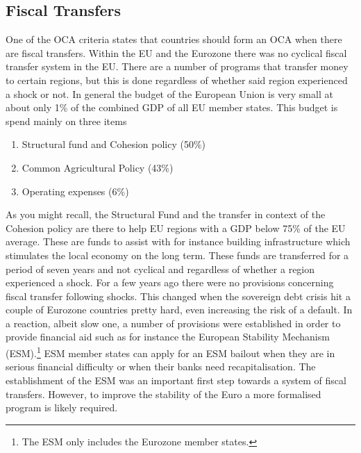\documentclass{tufte-handout}
\begin{document}
\subsection{Fiscal Transfers}
One of the OCA criteria states that countries should form an OCA when there are fiscal transfers. 
Within the EU and the Eurozone there was no cyclical fiscal transfer system in the EU.
There are a number of programs that transfer money to certain regions, but this is done regardless of whether said region experienced a shock or not. 
In general the budget of the European Union is very small at about only 1\% of the combined GDP of all EU member states. 
This budget is spend mainly on three items
\begin{enumerate}
  \item Structural fund and Cohesion policy (50\%)
  \item Common Agricultural Policy (43\%)
  \item Operating expenses (6\%)
\end{enumerate}
As you might recall, the Structural Fund and the transfer in context of the Cohesion policy are there to help EU regions with a GDP below 75\% of the EU average. 
These are funds to assist with for instance building infrastructure which stimulates the local economy on the long term. 
These funds are transferred for a period of seven years and not cyclical and regardless of whether a region experienced a shock.
For a few years ago there were no provisions concerning fiscal transfer following shocks. 
This changed when the sovereign debt crisis hit a couple of Eurozone countries pretty hard, even increasing the risk of a default. 
In a reaction, albeit slow one, a number of provisions were established in order to provide financial aid such as for instance the European Stability Mechanism (ESM).\footnote{The ESM only includes the Eurozone member states.} 
ESM member states can apply for an ESM bailout when they are in serious financial difficulty or when their banks need recapitalisation. 
The establishment of the ESM was an important first step towards a system of fiscal transfers. 
However, to improve the stability of the Euro a more formalised program is likely required.

\end{document}
